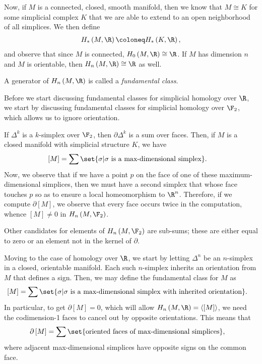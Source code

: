 \documentclass[10pt]{mypackage}
\begin{document}
Now, if $M$ is a connected, closed, smooth manifold, then we know that $M\cong K$ for some simplicial complex $K$ that we are able to extend to an open neighborhood of all simplices. We then define
\begin{align*}
  H_{\ast}\left( M,\R \right)\coloneq H_{\ast}\left( K,\R \right),
\end{align*}
and observe that since $M$ is connected, $H_0\left( M,\R \right)\cong \R$. If $M$ has dimension $n$ and $M$ is orientable, then $H_n\left( M,\R \right)\cong \R$ as well.
\begin{definition}
  A generator of $H_n\left( M,\R \right)$ is called a \textit{fundamental class}.
\end{definition}
Before we start discussing fundamental classes for simplicial homology over $\R$, we start by discussing fundamental classes for simplicial homology over $\F_{2}$, which allows us to ignore orientation.\newline

If $\Delta^{k}$ is a $k$-simplex over $\F_2$, then $\partial\Delta^{k}$ is a sum over faces. Then, if $M$ is a closed manifold with simplicial structure $K$, we have
\begin{align*}
  \left[ M \right] &= \sum\set{\sigma | \sigma\text{ is a max-dimensional simplex}}.
\end{align*}
Now, we observe that if we have a point $p$ on the face of one of these maximum-dimensional simplices, then we must have a second simplex that whose face touches $p$ so as to ensure a local homeomorphism to $\R^{n}$. Therefore, if we compute $\partial \left[ M \right]$, we observe that every face occurs twice in the computation, whence $ \left[ M \right]\neq 0 $ in $H_n\left( M,\F_2 \right)$.\newline

Other candidates for elements of $H_n\left( M,\F_2 \right)$ are sub-sums; these are either equal to zero or an element not in the kernel of $\partial$.\newline

Moving to the case of homology over $\R$, we start by letting $\Delta^{n}$ be an $n$-simplex in a closed, orientable manifold. Each such $n$-simplex inherits an orientation from $M$ that defines a sign. Then, we may define the fundamental class for $M$ as
\begin{align*}
  \left[ M \right] &= \sum\set{\sigma | \sigma\text{ is a max-dimensional simplex with inherited orientation}}.
\end{align*}
In particular, to get $\partial \left[ M \right] = 0$, which will allow $ H_n\left( M,\R \right) = \left\langle \left[ M \right] \right\rangle $, we need the codimension-1 faces to cancel out by opposite orientations. This means that
\begin{align*}
  \partial \left[ M \right] &= \sum\set{\text{oriented faces of max-dimensional simplices}},
\end{align*}
where adjacent max-dimensional simplices have opposite signs on the common face.\newline
\end{document}
